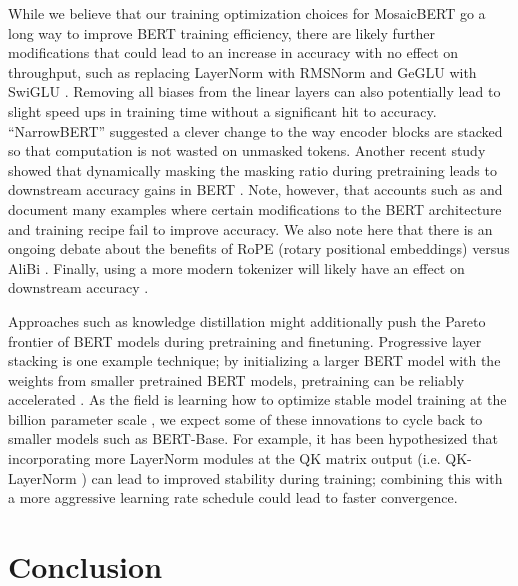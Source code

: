 \documentclass{article}
\begin{document}

While we believe that our training optimization choices for MosaicBERT go a long way to improve BERT training efficiency, there are likely further modifications that could lead to an increase in accuracy with no effect on throughput, such as replacing LayerNorm with RMSNorm \citep{zhang2019root} and GeGLU with SwiGLU \citep{shazeer2020glu,narang2021transformer}. Removing all biases from the linear layers can also potentially lead to slight speed ups in training time without a significant hit to accuracy. ``NarrowBERT'' \citep{li2023narrowbert} suggested a clever change to the way encoder blocks are stacked so that computation is not wasted on unmasked tokens. Another recent study showed that dynamically masking the masking ratio during pretraining leads to downstream accuracy gains in BERT \cite{ankner2023dynamic}.  Note, however, that accounts such as \citep{geiping2023cramming} and \citep{kaddour2023no} document many examples where certain modifications to the BERT architecture and training recipe fail to improve accuracy. We also note here that there is an ongoing debate about the benefits of RoPE (rotary positional embeddings) \citep{su2024roformer} versus AliBi \citep{press2021train}. Finally, using a more modern tokenizer will likely have an effect on downstream accuracy \citep{geiping2023cramming}.

Approaches such as knowledge distillation \citep{blakeney2022reduce} might additionally push the Pareto frontier of BERT models during pretraining and finetuning. Progressive layer stacking is one example technique; by initializing a larger BERT model with the weights from smaller pretrained BERT models, pretraining can be reliably accelerated \citep{gong2019efficient,kaddour2023no}. As the field is learning how to optimize stable model training at the billion parameter scale \citep{chowdhery2022palm,dehghani2023scaling}, we expect some of these innovations to cycle back to smaller models such as BERT-Base. For example, it has been hypothesized that incorporating more LayerNorm modules at the QK matrix output (i.e. QK-LayerNorm \citep{henry2020query}) can lead to improved stability during training; combining this with a more aggressive learning rate schedule could lead to faster convergence.




\section{Conclusion} 
\end{document}
